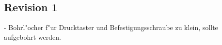 \subsection{Revision 1}
- Bohrl"ocher f"ur Drucktaster und Befestigungsschraube zu klein, sollte aufgebohrt werden.
